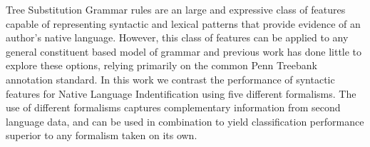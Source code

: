 Tree Substitution Grammar rules are an large and expressive class of features capable of representing syntactic and lexical patterns that provide evidence of
 an author's native language.  However, this class of features can be applied to
 any general constituent based model of grammar and previous work has done
 little to explore these options, relying primarily on the common Penn Treebank
 annotation standard.
 In this work we contrast the performance of syntactic features for Native
 Language Indentification using five
 different formalisms.  The use of different formalisms captures complementary
 information from second language data, 
 and can be used in combination to yield classification performance superior to
 any formalism taken on its own.

